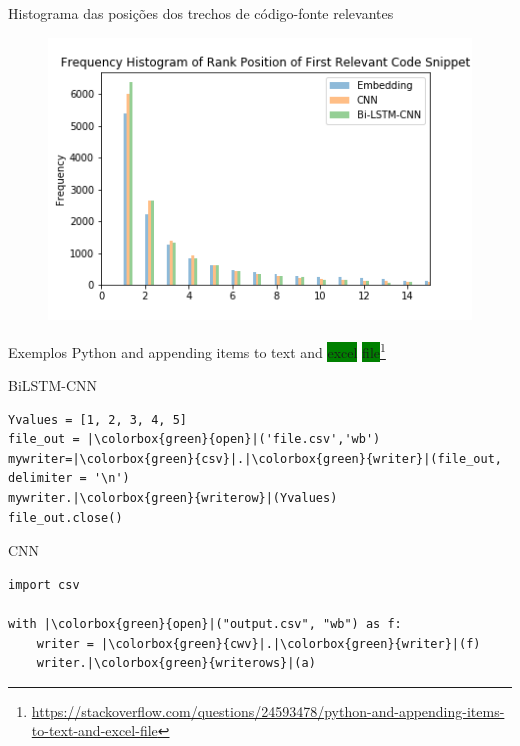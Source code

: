 \documentclass[10pt]{beamer}
\begin{document}
\begin{frame}{Histograma das posições dos trechos de código-fonte relevantes}
  \begin{figure}[h]
    \centering
    \includegraphics[width=1\textwidth]{figuras/histogram_results.png}
    \label{fig:histogram-results}
\end{figure}
\end{frame}

\begin{frame}[fragile]{Exemplos}
        \alert{Python and appending items to text and \colorbox{green}{excel} \colorbox{green}{file}}\footnote{{\tiny \url{https://stackoverflow.com/questions/24593478/python-and-appending-items-to-text-and-excel-file}}}
        \begin{exampleblock}{BiLSTM-CNN}
        \begin{verbatim}
Yvalues = [1, 2, 3, 4, 5]
file_out = |\colorbox{green}{open}|('file.csv','wb')
mywriter=|\colorbox{green}{csv}|.|\colorbox{green}{writer}|(file_out, delimiter = '\n')
mywriter.|\colorbox{green}{writerow}|(Yvalues)
file_out.close()
        \end{verbatim}
        \end{exampleblock}
        \begin{alertblock}{CNN}
        \begin{verbatim}
import csv

with |\colorbox{green}{open}|("output.csv", "wb") as f:
    writer = |\colorbox{green}{cwv}|.|\colorbox{green}{writer}|(f)
    writer.|\colorbox{green}{writerows}|(a)
    \end{verbatim}
    \end{alertblock}
    
\end{frame}
\end{document}
